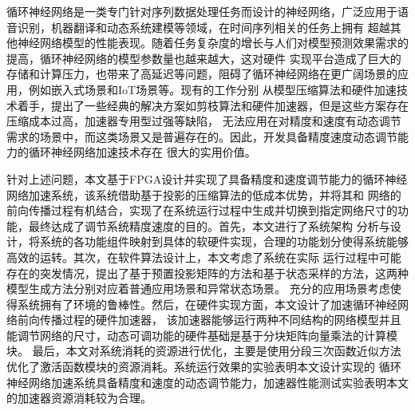 	
\begin{chineseabstract}
循环神经网络是一类专门针对序列数据处理任务而设计的神经网络，广泛应用于语音识别，机器翻译和动态系统建模等领域，在时间序列相关的任务上拥有
超越其他神经网络模型的性能表现。随着任务复杂度的增长与人们对模型预测效果需求的提高，循环神经网络的模型参数量也越来越大，这对硬件
实现平台造成了巨大的存储和计算压力，也带来了高延迟等问题，阻碍了循环神经网络在更广阔场景的应用，例如嵌入式场景和IoT场景等。现有的工作分别
从模型压缩算法和硬件加速技术着手，提出了一些经典的解决方案如剪枝算法和硬件加速器，但是这些方案存在压缩成本过高，加速器专用型过强等缺陷，
无法应用在对精度和速度有动态调节需求的场景中，而这类场景又是普遍存在的。因此，开发具备精度速度动态调节能力的循环神经网络加速技术存在
很大的实用价值。

针对上述问题，本文基于FPGA设计并实现了具备精度和速度调节能力的循环神经网络加速系统，该系统借助基于投影的压缩算法的低成本优势，并将其和
网络的前向传播过程有机结合，实现了在系统运行过程中生成并切换到指定网络尺寸的功能，最终达成了调节系统精度速度的目的。首先，本文进行了系统架构
分析与设计，将系统的各功能组件映射到具体的软硬件实现，合理的功能划分使得系统能够高效的运转。其次，在软件算法设计上，本文考虑了系统在实际
运行过程中可能存在的突发情况，提出了基于预置投影矩阵的方法和基于状态采样的方法，这两种模型生成方法分别对应着普通应用场景和异常状态场景。
充分的应用场景考虑使得系统拥有了环境的鲁棒性。然后，在硬件实现方面，本文设计了加速循环神经网络前向传播过程的硬件加速器，
该加速器能够运行两种不同结构的网络模型并且能调节网络的尺寸，动态可调功能的硬件基础是基于分块矩阵向量乘法的计算模块。
最后，本文对系统消耗的资源进行优化，主要是使用分段三次函数近似方法优化了激活函数模块的资源消耗。系统运行效果的实验表明本文设计实现的
循环神经网络加速系统具备精度和速度的动态调节能力，加速器性能测试实验表明本文的加速器资源消耗较为合理。



\end{chineseabstract}

